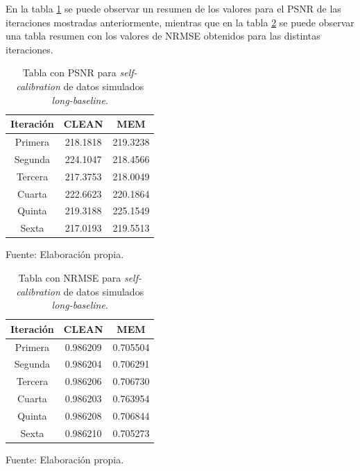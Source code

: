 En la tabla \ref{tab:sim_long_selfcal_psnr} se puede observar un resumen de los valores para el PSNR de las iteraciones mostradas anteriormente, mientras que en la tabla \ref{tab:sim_long_selfcal_nrmse} se puede observar una tabla resumen con los valores de NRMSE obtenidos para las distintas iteraciones. 

\begin{table}[!ht]
	\begin{center}
		\caption{Tabla con PSNR para \textit{self-calibration} de datos simulados \textit{long-baseline}.}
		\begin{tabular}{| c | c | c |}
			\hline
			Iteración & CLEAN & MEM\\ \hline
			Primera & 218.1818 & 219.3238\\ \hline
            Segunda & 224.1047 & 218.4566\\ \hline
            Tercera & 217.3753 & 218.0049\\ \hline
            Cuarta & 222.6623 & 220.1864\\ \hline
            Quinta & 219.3188 & 225.1549\\ \hline
            Sexta & 217.0193 & 219.5513\\ \hline
		\end{tabular}
		\label{tab:sim_long_selfcal_psnr}
	\end{center}
	\begin{center}
		Fuente: Elaboración propia.
	\end{center}
\end{table}

\begin{table}[!ht]
	\begin{center}
		\caption{Tabla con NRMSE para \textit{self-calibration} de datos simulados \textit{long-baseline}.}
		\begin{tabular}{| c | c | c |}
			\hline
			Iteración & CLEAN & MEM\\ \hline
			Primera & 0.986209 & 0.705504\\ \hline
            Segunda & 0.986204 & 0.706291\\ \hline
            Tercera & 0.986206 & 0.706730\\ \hline
            Cuarta & 0.986203 & 0.763954\\ \hline
            Quinta & 0.986208 & 0.706844\\ \hline
            Sexta & 0.986210 & 0.705273\\ \hline
		\end{tabular}
		\label{tab:sim_long_selfcal_nrmse}
	\end{center}
	\begin{center}
		Fuente: Elaboración propia.
	\end{center}
\end{table}

